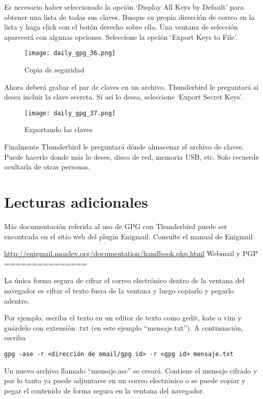 \documentclass[10pt,a5paper,twoside,,]{book}
\begin{document}
Es necesario haber seleccionado la opción `Display All Keys by Default'
para obtener una lista de todas sus claves. Busque su propia dirección
de correo en la lista y haga click con el botón derecho sobre ella. Una
ventana de selección aparecerá con algunas opciones. Seleccione la
opción `Export Keys to File'.

\begin{figure}[htbp]
\centering
\texttt{[image: daily\_gpg\_36.png]}
\caption{Copia de seguridad}
\end{figure}

Ahora deberá grabar el par de claves en un archivo. Thunderbird le
preguntará si desea incluir la clave secreta. Si así lo desea,
seleccione `Export Secret Keys'.

\begin{figure}[htbp]
\centering
\texttt{[image: daily\_gpg\_37.png]}
\caption{Exportando las claves}
\end{figure}

Finalmente Thunderbird le preguntará dónde almacenar el archivo de
claves. Puede hacerlo donde más lo desee, disco de red, memoria USB,
etc. Solo recuerde ocultarla de otras personas.

\section{Lecturas adicionales}\label{lecturas-adicionales}

Más documentación referida al uso de GPG con Thunderbird puede ser
encontrada en el sitio web del plugin Enigmail. Consulte el manual de
Enigmail

\url{http://enigmail.mozdev.org/documentation/handbook.php.html} Webmail
y PGP ===============

La única forma segura de cifrar el correo electrónico dentro de la
ventana del navegador es cifrar el texto fuera de la ventana y luego
copiarlo y pegarlo adentro.

Por ejemplo, escriba el texto en un editor de texto como gedit, kate o
vim y guárdelo con extensión .txt (en este ejemplo ``mensaje.txt''). A
continuación, escriba

\begin{verbatim}
gpg -ase -r <dirección de email/gpg id> -r <gpg id> mensaje.txt
\end{verbatim}

Un nuevo archivo llamado ``mensaje.asc'' se creará. Contiene el mensaje
cifrado y por lo tanto ya puede adjuntarse en un correo electrónico o se
puede copiar y pegar el contenido de forma segura en la ventana del
navegador.
\end{document}
